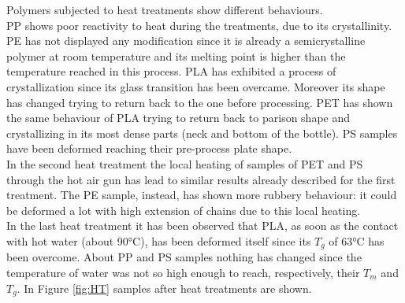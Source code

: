 \documentclass[a4paper, 11pt]{article}
\begin{document}
Polymers subjected to heat treatments show different behaviours. \\
PP shows poor reactivity to heat during the treatments, due to its crystallinity. PE has not displayed any modification since it is already a semicrystalline polymer at room temperature and its melting point is higher than the temperature reached in this process. PLA has exhibited a process of crystallization since its glass transition has been overcame. Moreover its shape has changed trying to return back to the one before processing. PET has shown the same behaviour of PLA trying to return back to parison shape and crystallizing in its most dense parts (neck and bottom of the bottle). PS samples have been deformed reaching their pre-process plate shape. \\
In the second heat treatment the local heating of samples of PET and PS through the hot air gun has lead to similar results already described for the first treatment. The PE sample, instead, has shown more rubbery behaviour: it could be deformed a lot with high extension of chains due to this local heating. \\ 
In the last heat treatment it has been observed that PLA, as soon as the contact with hot water (about 90°C), has been deformed itself since its $T_{g}$ of 63°C has been overcome. About PP and PS samples nothing has changed since the temperature of water was not so high enough to reach, respectively, their $T_{m}$ and $T_{g}$. In Figure \ref{fig:HT} samples after heat treatments are shown.
\end{document}
